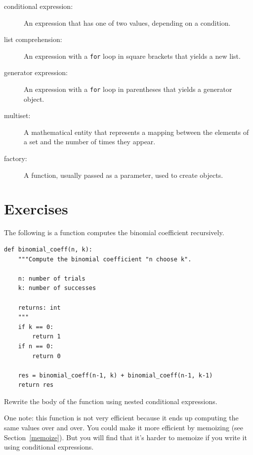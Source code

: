 \documentclass[10pt]{book}
\begin{document}
\begin{description}

\item[conditional expression:] An expression that has one of two
values, depending on a condition.

\item[list comprehension:] An expression with a {\tt for} loop in square
brackets that yields a new list.

\item[generator expression:] An expression with a {\tt for} loop in parentheses
that yields a generator object.  

\item[multiset:] A mathematical entity that represents a mapping
between the elements of a set and the number of times they appear.

\item[factory:] A function, usually passed as a parameter, used to
create objects. 

\end{description}




\section{Exercises}

\begin{exercise}

The following is a function computes the binomial
coefficient recursively.

\begin{verbatim}
def binomial_coeff(n, k):
    """Compute the binomial coefficient "n choose k".

    n: number of trials
    k: number of successes

    returns: int
    """
    if k == 0:
        return 1
    if n == 0:
        return 0

    res = binomial_coeff(n-1, k) + binomial_coeff(n-1, k-1)
    return res
\end{verbatim}

Rewrite the body of the function using nested conditional
expressions.

One note: this function is not very efficient because it ends up computing
the same values over and over.  You could make it more efficient by
memoizing (see Section~\ref{memoize}).  But you will find that it's harder to
memoize if you write it using conditional expressions.

\end{exercise}
\end{document}
